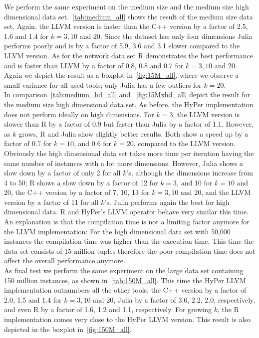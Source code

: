 We perform the same experiment on the medium size and the medium size high dimensional data set.~\autoref{tab:medium_all} shows the result of the medium size data set. Again, the LLVM version is faster than the C++ version by a factor of 2.5, 1.6 and 1.4 for $k = 3, 10$ and $20$. Since the dataset has only four dimensions Julia performs poorly and is by a factor of 5.9, 3.6 and 3.1 slower compared to the LLVM version. As for the network data set R demonstrates the best performance and is faster than LLVM by a factor of 0.8, 0.8 and 0.7 for $k = 3, 10$ and 20. Again we depict the result as a boxplot in~\autoref{fig:15M_all}, where we observe a small variance for all used tools; only Julia has a few outliers for $k = 20$.
\\
In comparison~\autoref{tab:medium_hd_all} and ~\autoref{fig:15Mxhd_all} depict the result for the medium size high dimensional data set. As before, the HyPer implementation does not perform ideally on high dimensions. For $k = 3$, the LLVM version is slower than R by a factor of 0.9 but faster than Julia by a factor of 1.1. However, as $k$ grows, R and Julia show slightly better results. Both show a speed up by a factor of 0.7 for $k = 10$, and 0.6 for $k = 20$, compared to the LLVM version. 
\\
Obviously the high dimensional data set takes more time per iteration having the same number of instances with a lot more dimensions. However, Julia shows a slow down by a factor of only 2 for all $k$'s, although the dimensions increase from 4 to 50; R shows a slow down by a factor of 12 for $k = 3$, and 10 for $k = 10$ and 20, the C++ version by a factor of 7, 10, 13 for $k = 3, 10$ and 20, and the LLVM version by a factor of 11 for all $k$'s. Julia performs again the best for high dimensional data. R and HyPer's LLVM operator behave very similar this time. An explanation is that the compilation time is not a limiting factor anymore for the LLVM implementation: For the high dimensional data set with 50,000 instances the compilation time was higher than the execution time. This time the data set consists of 15 million tuples therefore the poor compilation time does not affect the overall performance anymore.
\\
As final test we perform the same experiment on the large data set containing 150 million instances, as shown in~\autoref{tab:150M_all}. This time the HyPer LLVM implementation outnumbers all the other tools, the C++ version by a factor of 2.0, 1.5 and 1.4 for $k = 3, 10$ and 20, Julia by a factor of 3.6, 2.2, 2.0, respectively, and even R by a factor of 1.6, 1.2 and 1.1, respectively. For growing $k$, the R implementation comes very close to the HyPer LLVM version. This result is also depicted in the boxplot in~\autoref{fig:150M_all}.
